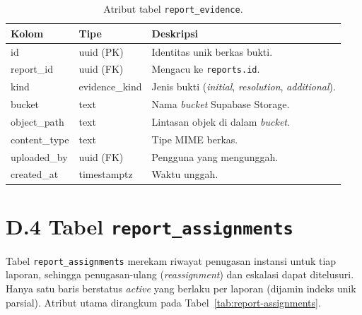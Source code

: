 \begin{table}[htbp]
\centering
\caption{Atribut tabel \texttt{report\_evidence}.}
\label{tab:report-evidence}
\small
\begin{tabular}{p{3.4cm} p{2.6cm} p{6.5cm}}
\toprule
\textbf{Kolom} & \textbf{Tipe} & \textbf{Deskripsi} \\
\midrule
id & uuid (PK) & Identitas unik berkas bukti. \\
report\_id & uuid (FK) & Mengacu ke \texttt{reports.id}. \\
kind & evidence\_kind & Jenis bukti (\textit{initial}, \textit{resolution}, \textit{additional}). \\
bucket & text & Nama \textit{bucket} Supabase Storage. \\
object\_path & text & Lintasan objek di dalam \textit{bucket}. \\
content\_type & text & Tipe MIME berkas. \\
uploaded\_by & uuid (FK) & Pengguna yang mengunggah. \\
created\_at & timestamptz & Waktu unggah. \\
\bottomrule
\end{tabular}
\end{table}

\section*{D.4 Tabel \texttt{report\_assignments}}

Tabel \texttt{report\_assignments} merekam riwayat penugasan instansi untuk tiap laporan, sehingga penugasan-ulang (\textit{reassignment}) dan eskalasi dapat ditelusuri. Hanya satu baris berstatus \textit{active} yang berlaku per laporan (dijamin indeks unik parsial). Atribut utama dirangkum pada Tabel~\ref{tab:report-assignments}.

